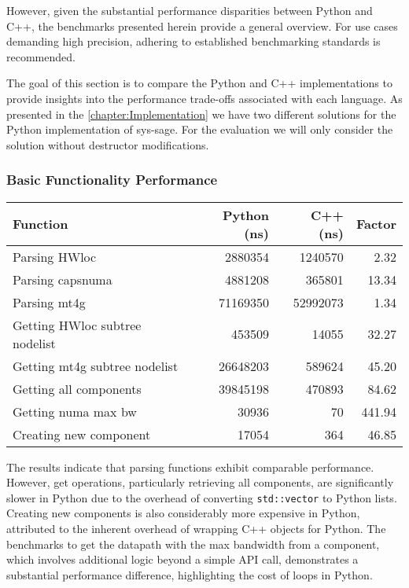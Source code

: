 However, given the substantial performance disparities between Python and C++, the benchmarks presented herein provide a general overview. For use cases demanding high precision, adhering to established benchmarking standards is recommended.

The goal of this section is to compare the Python and C++ implementations to provide insights into the performance trade-offs associated with each language. As presented in the \autoref{chapter:Implementation} we have two different solutions for the Python implementation of sys-sage. For the evaluation we will only consider the solution without destructor modifications.

\subsubsection{Basic Functionality Performance}

\begin{center}
\begin{tabular}{lrrr}
\textbf{Function} & \textbf{Python (ns)} & \textbf{C++ (ns)} & \textbf{Factor} \\
\hline
Parsing HWloc & 2880354 & 1240570 & 2.32 \\
Parsing capsnuma & 4881208 & 365801 & 13.34 \\
Parsing mt4g & 71169350 & 52992073 & 1.34 \\
Getting HWloc subtree nodelist & 453509 & 14055 & 32.27 \\
Getting mt4g subtree nodelist & 26648203 & 589624 & 45.20 \\
Getting all components & 39845198 & 470893 & 84.62 \\
Getting numa max bw & 30936 & 70 & 441.94 \\
Creating new component & 17054 & 364 & 46.85 \\
\end{tabular}
\end{center}

The results indicate that parsing functions exhibit comparable performance. However, get operations, particularly retrieving all components, are significantly slower in Python due to the overhead of converting \texttt{std::vector} to Python lists. Creating new components is also considerably more expensive in Python, attributed to the inherent overhead of wrapping C++ objects for Python. The benchmarks to get the datapath with the max bandwidth from a component, which involves additional logic beyond a simple API call, demonstrates a substantial performance difference, highlighting the cost of loops in Python.

